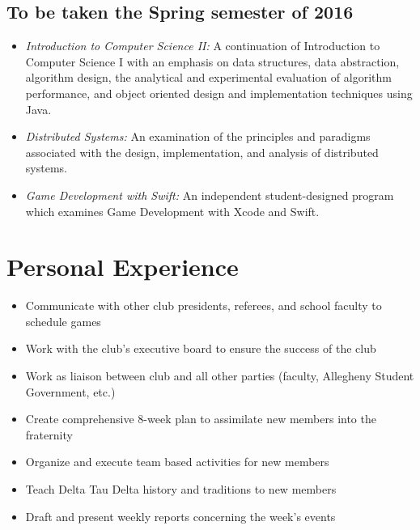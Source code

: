 \documentclass[11pt,a4paper,sans]{moderncv} %
\begin{document}
{{\subsection{To be taken the Spring semester of 2016}
\begin{itemize}
\item{\textit{Introduction to Computer Science II: }{A continuation of Introduction to Computer Science I with an emphasis on data structures, data abstraction, algorithm design, the analytical and experimental evaluation of algorithm performance, and object oriented design and implementation techniques using Java.}}
\item{\textit{Distributed Systems: }{An examination of the principles and paradigms associated with the design, implementation, and analysis of distributed systems.}}
\item{\textit{Game Development with Swift: }{ An independent student-designed program which examines Game Development with Xcode and Swift.}}
\end{itemize}

\section{Personal Experience}
\begin{itemize}
\item{Communicate with other club presidents, referees, and school faculty to schedule games}
\item{Work with the club's executive board to ensure the success of the club}
\item{Work as liaison between club and all other parties (faculty, Allegheny Student Government, etc.) }
\end{itemize}

\begin{itemize}
\item{Create comprehensive 8-week plan to assimilate new members into the fraternity}
\item{Organize and execute team based activities for new members}
\item{Teach Delta Tau Delta history and traditions to new members}
\item{Draft and present weekly reports concerning the week's events}
\end{itemize}

}}
\end{document}
